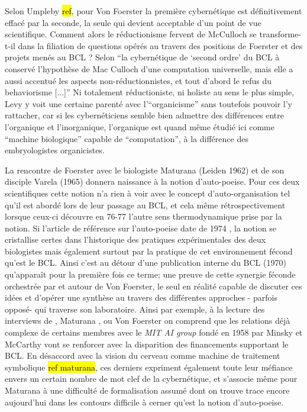Selon Umpleby \hl{ref}, pour Von Foerster la première cybernétique est définitivement effacé par la seconde, la seule qui devient acceptable d'un point de vue scientifique. Comment alors le réductionisme fervent de McCulloch se transforme-t-il dans la filiation de questions opérés au travers des positions de Foerster et des projets menés au BCL ? Selon \textcite[120-122]{Livet1985} \enquote{la cybernétique de \enquote{second ordre} du BCL à conservé l'hypothèse de Mac Culloch d'une computation universelle, mais elle a aussi accentué les aspects non-réductionnistes, et tout d'abord le refus du behaviorisme [...]} Ni totalement réductioniste, ni holiste au sens le plus simple, Levy y voit une certaine parenté avec l'\enquote{organicisme} sans toutefois pouvoir l'y rattacher, car si les cybernéticiens semble bien admettre des différences entre l'organique et l'inorganique, l'organique est quand même étudié ici comme \enquote{machine biologique} capable de \enquote{computation}, à la différence des embryologistes organicistes.

La rencontre de Foerster avec le biologiste Maturana (Leiden 1962) et de son disciple Varela (1965) donnera naissance à la notion d'auto-poeise. Pour ces deux scientifiques cette notion n'a rien à voir avec le concept d'auto-organisation tel qu'il est abordé lors de leur passage au BCL, et cela même rétrospectivement lorsque ceux-ci découvre en 76-77 l'autre sens thermodynamique prise par la notion. Si l'article de référence sur l'auto-poeise date de 1974 \autocite{Varela1974}, la notion se cristallise certes dans l'historique des pratiques expérimentales des deux biologistes mais également surtout par la pratique de cet environnement fécond qu'est le BCL. Ainsi c'est au détour d'une publication interne du BCL (1970) qu’apparaît pour la première fois ce terme; une preuve de cette synergie féconde orchestrée par et autour de Von Foerster, le seul en réalité capable de discuter ces idées et d'opérer une synthèse au travers des différentes approches - parfois opposé-  qui traverse son laboratoire. \autocites[283-287]{CREA1985}{Muller2007b, Varela1995} Ainsi par exemple, à la lecture des interviews de \textcite{Varela1995}, Maturana \autocite{Muller2007b}, ou Von Foerster \autocite{Franchi1995} on comprend que les relations déjà complexe de certains membres avec le \textit{MIT AI group} fondé en 1958 par Minsky et McCarthy vont se renforcer avec la disparition des financements supportant le BCL. En désaccord avec la vision du cerveau comme machine de traitement symbolique \hl{ref maturana}, ces derniers expriment également toute leur méfiance envers un certain nombre de mot clef de la cybernétique, et s'associe même pour Maturana à une difficulté de formalisation assumé \autocite[258-263]{CREA1985} dont on trouve trace encore aujourd'hui dans les contours difficile à cerner qu'est la notion d'auto-poeise.

